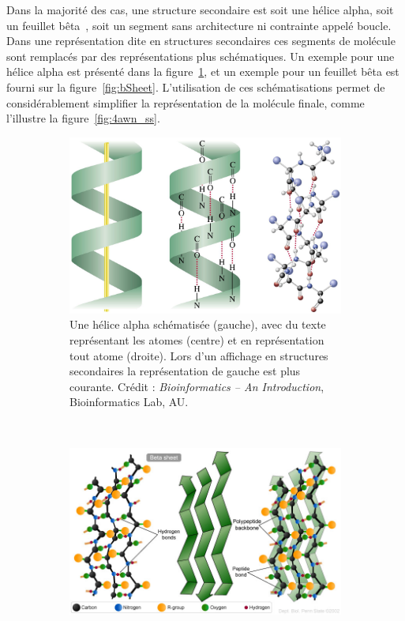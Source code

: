 	Dans la majorité des cas, une structure secondaire est soit une hélice alpha, soit un feuillet bêta~\cite{pauling1951structure}, soit un segment sans architecture ni contrainte appelé boucle. Dans une représentation dite \og en structures secondaires \fg{} ces segments de molécule sont remplacés par des représentations plus schématiques. Un exemple pour une hélice alpha est présenté dans la figure~\ref{fig:aHelix}, et un exemple pour un feuillet bêta est fourni sur la figure~\ref{fig:bSheet}. L'utilisation de ces schématisations permet de considérablement simplifier la représentation de la molécule finale, comme l'illustre la figure~\ref{fig:4awn_ss}.
	
	\begin{figure}[H]
		\begin{subfigure}[b]{.49\textwidth}
			\centering
			\includegraphics[width=\textwidth]{./figures/ch1/aHelix}
			\caption[Hélices alpha, trois représentations différentes]{Une hélice alpha schématisée (gauche), avec du texte représentant les atomes (centre) et en représentation \og tout atome \fg{} (droite). Lors d'un affichage \og en structures secondaires \fg{} la représentation de gauche est plus courante. Crédit : \emph{Bioinformatics -- An Introduction}, Bioinformatics Lab, AU\footnotemark.}
			\label{fig:aHelix}
		\end{subfigure}
		~
		\begin{subfigure}[b]{.49\textwidth}
			\centering
			\includegraphics[width=\textwidth]{./figures/ch1/bSheet}

\end{subfigure}
\end{figure}
